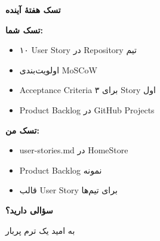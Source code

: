 \documentclass[14pt, a4paper, landscape]{extarticle}
\newcommand{\slide}[1]{%
    \newpage
    \begin{center}
    \begin{minipage}[t]{0.95\textwidth}
    \vspace{0.5cm}
    #1
    \vspace{0.5cm}
    \end{minipage}
    \end{center}
}
\newcommand{\slidetitle}[1]{%
    \begin{center}
        {\LARGE\bfseries\textcolor{primary}{#1}}
    \end{center}
    \vspace{0.5cm}
}
\newcommand{\myaccent}[1]{\textcolor{accent}{#1}}
\begin{document}
\slide{
    \slidetitle{تسک هفتهٔ آینده}
    \vspace{0.5cm}
    \begin{minipage}[t]{0.48\textwidth}
        {\bfseries\textcolor{primary}{تسک شما:}}
        \vspace{0.3cm}
        \begin{itemize}[itemsep=0.3em]
            \item ۱۰ User Story در Repository تیم
            \item اولویت‌بندی MoSCoW
            \item Acceptance Criteria برای ۳ Story اول
            \item Product Backlog در GitHub Projects
        \end{itemize}
    \end{minipage}
    \hfill
    \begin{minipage}[t]{0.48\textwidth}
        {\bfseries\myaccent{تسک من:}}
        \vspace{0.3cm}
        \begin{itemize}[itemsep=0.3em]
            \item user-stories.md در HomeStore
            \item Product Backlog نمونه
            \item قالب User Story برای تیم‌ها
        \end{itemize}
    \end{minipage}
}

\slide{
    \begin{center}
        \vspace{3cm}
        {\Huge\bfseries سؤالی دارید؟}
        
        \vspace{1.5cm}
        
        {\LARGE\myaccent{به امید یک ترم پربار}}
    \end{center}
}
\end{document}
